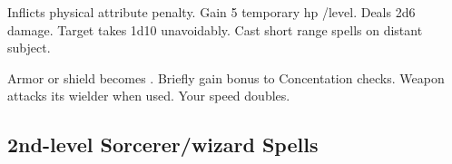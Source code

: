 \begin{swspelllist}
   Inflicts  physical attribute penalty.
   Gain 5 temporary hp /level.
   Deals 2d6 damage.
   Target takes 1d10 unavoidably.
   Cast short range spells on distant subject.

   Armor or shield becomes .
   Briefly gain bonus to Concentation checks.
   Weapon attacks its wielder when used.
   Your speed doubles.
\end{swspelllist}

\subsection{2nd-level Sorcerer/wizard Spells} 
